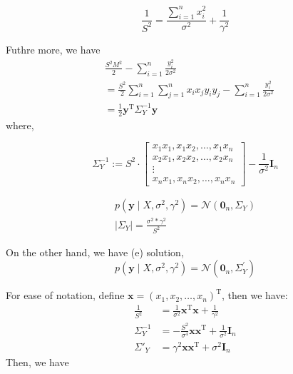 \documentclass[11pt]{article}
\begin{document}
\begin{enumerate}
\begin{enumerate}[label=(\alph*)]
$$
\frac{1}{S^2} = \frac{\sum_{i=1}^{n}{x_i^2}}{\sigma^2} + \frac{1}{\gamma^2}
$$


Futhre more, we have 
$$
\begin{aligned}
&\frac{S^{2} M^{2}}{2}-\sum_{i=1}^{n} \frac{y_{i}^{2}}{2 \sigma^{2}} \\
&=\frac{S^{2}}{2} \sum_{i=1}^{n} \sum_{j=1}^{n} x_{i} x_{j} y_{i} y_{j}-\sum_{i=1}^{n} \frac{y_{i}^{2}}{2 \sigma^{2}} \\
&=\frac{1}{2} \mathbf{y}^{\mathrm{T}} \Sigma_{Y}^{-1} \mathbf{y}
\end{aligned}
$$
where,

$$
\Sigma_{Y}^{-1}:=S^{2} \cdot\left[\begin{array}{c}
x_{1} x_{1}, x_{1} x_{2}, \ldots, x_{1} x_{n} \\
x_{2} x_{1}, x_{2} x_{2}, \ldots, x_{2} x_{n} \\
\vdots \\
x_{n} x_{1}, x_{n} x_{2}, \ldots, x_{n} x_{n}
\end{array}\right]-\frac{1}{\sigma^{2}} \mathbf{I}_{n}
$$

$$
\begin{gathered}
p\left(\mathbf{y} \mid X, \sigma^{2}, \gamma^{2}\right)=\mathcal{N}\left(\mathbf{0}_{n}, \Sigma_{Y}\right) \\
\left|\Sigma_{Y}\right|=\frac{\sigma^{2} * \gamma^{2}}{S^{2}}
\end{gathered}
$$

On the other hand, we have (e) solution,
$$
p\left(\mathbf{y} \mid X, \sigma^{2}, \gamma^{2}\right)=\mathcal{N}\left(\mathbf{0}_{n}, \Sigma_{Y}^{\prime}\right)
$$


For ease of notation, define $\textbf{x}=(x_1,x_2,\dots,x_n)^{\mathrm{T}}$, then we have:
$$
\begin{aligned}
\frac{1}{S^2} &= \frac{1}{\sigma^2} \textbf{x}^{\mathrm{T}}\textbf{x}+\frac{1}{\gamma^2}\label{eq:S}\\
\Sigma^{-1}_Y &= -\frac{S^2}{\sigma^4} \textbf{x}\textbf{x}^{\mathrm{T}}+\frac{1}{\sigma^2}\textbf{I}_n\\
\Sigma'_Y &= \gamma^2 \textbf{x}\textbf{x}^{\mathrm{T}} + \sigma^2\textbf{I}_n
\end{aligned}
$$
Then, we have


\end{enumerate}
\end{enumerate}
\end{document}
